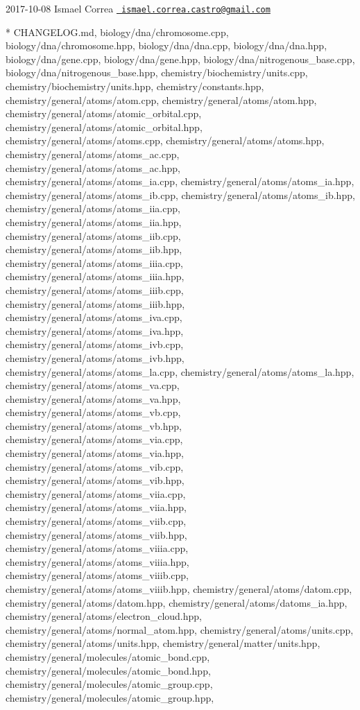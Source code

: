  2017-\/10-\/08 Ismael Correa \href{mailto:ismael.correa.castro@gmail.com}{\texttt{ ismael.\+correa.\+castro@gmail.\+com}} \begin{DoxyVerb}* CHANGELOG.md, biology/dna/chromosome.cpp,
biology/dna/chromosome.hpp, biology/dna/dna.cpp,
biology/dna/dna.hpp, biology/dna/gene.cpp, biology/dna/gene.hpp,
biology/dna/nitrogenous_base.cpp, biology/dna/nitrogenous_base.hpp,
chemistry/biochemistry/units.cpp, chemistry/biochemistry/units.hpp,
chemistry/constants.hpp, chemistry/general/atoms/atom.cpp,
chemistry/general/atoms/atom.hpp,
chemistry/general/atoms/atomic_orbital.cpp,
chemistry/general/atoms/atomic_orbital.hpp,
chemistry/general/atoms/atoms.cpp,
chemistry/general/atoms/atoms.hpp,
chemistry/general/atoms/atoms_ac.cpp,
chemistry/general/atoms/atoms_ac.hpp,
chemistry/general/atoms/atoms_ia.cpp,
chemistry/general/atoms/atoms_ia.hpp,
chemistry/general/atoms/atoms_ib.cpp,
chemistry/general/atoms/atoms_ib.hpp,
chemistry/general/atoms/atoms_iia.cpp,
chemistry/general/atoms/atoms_iia.hpp,
chemistry/general/atoms/atoms_iib.cpp,
chemistry/general/atoms/atoms_iib.hpp,
chemistry/general/atoms/atoms_iiia.cpp,
chemistry/general/atoms/atoms_iiia.hpp,
chemistry/general/atoms/atoms_iiib.cpp,
chemistry/general/atoms/atoms_iiib.hpp,
chemistry/general/atoms/atoms_iva.cpp,
chemistry/general/atoms/atoms_iva.hpp,
chemistry/general/atoms/atoms_ivb.cpp,
chemistry/general/atoms/atoms_ivb.hpp,
chemistry/general/atoms/atoms_la.cpp,
chemistry/general/atoms/atoms_la.hpp,
chemistry/general/atoms/atoms_va.cpp,
chemistry/general/atoms/atoms_va.hpp,
chemistry/general/atoms/atoms_vb.cpp,
chemistry/general/atoms/atoms_vb.hpp,
chemistry/general/atoms/atoms_via.cpp,
chemistry/general/atoms/atoms_via.hpp,
chemistry/general/atoms/atoms_vib.cpp,
chemistry/general/atoms/atoms_vib.hpp,
chemistry/general/atoms/atoms_viia.cpp,
chemistry/general/atoms/atoms_viia.hpp,
chemistry/general/atoms/atoms_viib.cpp,
chemistry/general/atoms/atoms_viib.hpp,
chemistry/general/atoms/atoms_viiia.cpp,
chemistry/general/atoms/atoms_viiia.hpp,
chemistry/general/atoms/atoms_viiib.cpp,
chemistry/general/atoms/atoms_viiib.hpp,
chemistry/general/atoms/datom.cpp,
chemistry/general/atoms/datom.hpp,
chemistry/general/atoms/datoms_ia.hpp,
chemistry/general/atoms/electron_cloud.hpp,
chemistry/general/atoms/normal_atom.hpp,
chemistry/general/atoms/units.cpp,
chemistry/general/atoms/units.hpp,
chemistry/general/matter/units.hpp,
chemistry/general/molecules/atomic_bond.cpp,
chemistry/general/molecules/atomic_bond.hpp,
chemistry/general/molecules/atomic_group.cpp,
chemistry/general/molecules/atomic_group.hpp,

\end{DoxyVerb}
